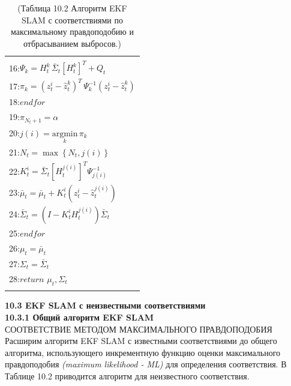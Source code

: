 \documentclass[10pt,a4paper]{article}
\begin{document}
\begin{table}[H]
\begin{center}
\begin{tabular}{|l|}
\begin{minipage}{0.2\textwidth}
\begin{equation*}
				\end{equation*}
\end{minipage}\\
16:\hspace{9mm}$\varPsi_k=H_t^k\,\bar{\varSigma}_t[H_t^k]^T+Q_t$\\
17:\hspace{9mm}$\pi_k=(z_t^i-\hat{z}_t^k)^T\,\varPsi_k^{-1}(z_t^i-\hat{z}_t^k)$\\
18:\hspace{4mm}$\textit{endfor}$\\
19:\hspace{4mm}$\pi_{N_t+1}=\alpha$\\
20:\hspace{4mm}$j(i)=\underset{k}{\text{argmin}}\,\pi_k$\\
21:\hspace{4mm}$N_t=\max\left\lbrace  N_t,j(i)\right\rbrace $\\
22:\hspace{4mm}$K_t^i=\bar{\varSigma}_t [H_t^{j(i)}]^T\varPsi_{j(i)}^{-1}$\\
23:\hspace{4mm}$\bar{\mu}_t=\bar{\mu}_t+K_t^i(z_t^i-\hat{z}_t^{j(i)})$\\
24:\hspace{4mm}$\bar{\varSigma}_t=(I-K_t^iH_t^{j(i)})\bar{\varSigma}_t$\\
25:\hspace{1mm}$\textit{endfor}$\\
26:\hspace{1mm}$\mu_t=\bar{\mu}_t$\\
27:\hspace{1mm}$\varSigma_t=\bar{\varSigma}_t$\\
28:\hspace{1mm}$\textit{return}\,\,\mu_t,\varSigma_t$\\
{}\\
\hline
\end{tabular}
\caption{(Таблица 10.2 Алгоритм EKF SLAM с соответствиями по максимальному правдоподобию и отбрасыванием выбросов.)}
\end{center}
\end{table}

\textbf{10.3	EKF SLAM с неизвестными соответствиями}\\

\textbf{10.3.1	Общий алгоритм EKF SLAM }\\

СООТВЕТСТВИЕ МЕТОДОМ МАКСИМАЛЬНОГО ПРАВДОПОДОБИЯ\\
Расширим алгоритм EKF SLAM с известными соответствиями до общего алгоритма, использующего инкрементную функцию оценки максимального правдоподобия \textit{(maximum likelihood - ML)} для определения соответствия.  В Таблице 10.2 приводится алгоритм для неизвестного соответствия.
\end{document}
